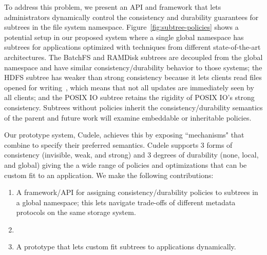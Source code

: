 To address this problem, we present an API and framework that lets administrators
dynamically control the consistency and durability guarantees for subtrees in
the file system namespace.  Figure~\ref{fig:subtree-policies} shows a potential
setup in our proposed system where a single global namespace has subtrees for
applications optimized with techniques from different state-of-the-art
architectures.  The BatchFS and RAMDisk subtrees are decoupled from the global
namespace and have similar consistency/durability behavior to those systems;
the HDFS subtree has weaker than strong consistency because it lets clients
read files opened for writing~\cite{hakimzadeh:dais14-hdfs-consistency}, which
means that not all updates are immediately seen by all clients; and the POSIX
IO subtree retains the rigidity of POSIX IO's strong consistency.  Subtrees
without policies inherit the consistency/durability semantics of the parent and
future work will examine embeddable or inheritable policies.

Our prototype system, Cudele, achieves this by exposing ``mechanisms" that
 combine to specify their
preferred semantics.  Cudele supports 3 forms of consistency (invisible, weak,
and strong) and 3 degrees of durability (none, local, and global) giving the
 a wide range of policies and
optimizations that can be custom fit to an application. We make the following
contributions:

\begin{enumerate}

  \item A framework/API for assigning consistency/durability policies to
  subtrees in a global namespace; this lets
   navigate trade-offs of
  different metadata protocols on the same storage system.

  \item

   

  \item A prototype that lets 
  custom fit subtrees to applications dynamically. 

\end{enumerate}

